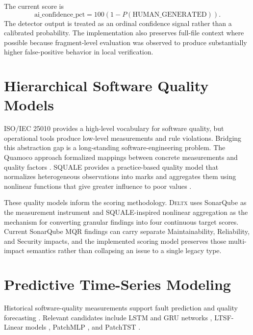 \documentclass[12pt,a4paper,oneside]{report}
\newcommand{\systemname}{\textsc{Deltx}}
\begin{document}
The current score is
\begin{equation}
    \mathrm{ai\_confidence\_pct}=100\left(1-P(\mathrm{HUMAN\_GENERATED})\right).
\end{equation}
The detector output is treated as an ordinal confidence signal rather than a calibrated probability. The implementation also preserves full-file context where possible because fragment-level evaluation was observed to produce substantially higher false-positive behavior in local verification.

\section{Hierarchical Software Quality Models}
ISO/IEC 25010 provides a high-level vocabulary for software quality, but operational tools produce low-level measurements and rule violations. Bridging this abstraction gap is a long-standing software-engineering problem. The Quamoco approach formalized mappings between concrete measurements and quality factors \citep{quamoco_product_quality_modelling_assessment}. SQUALE provides a practice-based quality model that normalizes heterogeneous observations into marks and aggregates them using nonlinear functions that give greater influence to poor values \citep{squale_model_practice_based_industrial_quality_model,software_quality_metrics_aggregation_industry}.

These quality models inform the scoring methodology. \systemname{} uses SonarQube as the measurement instrument and SQUALE-inspired nonlinear aggregation as the mechanism for converting granular findings into four continuous target scores. Current SonarQube MQR findings can carry separate Maintainability, Reliability, and Security impacts, and the implemented scoring model preserves those multi-impact semantics rather than collapsing an issue to a single legacy type.

\section{Predictive Time-Series Modeling}
Historical software-quality measurements support fault prediction and quality forecasting \citep{fault_prediction_software_metrics_sonarqube_rules,software_service_supporting_software_quality_forecasting}. Relevant candidates include LSTM and GRU networks \citep{chung2014gated_recurrent_networks}, LTSF-Linear models \citep{zeng2023ltsf_linear}, PatchMLP \citep{tang2024patchmlp}, and PatchTST \citep{nie2023patchtst}.
\end{document}
